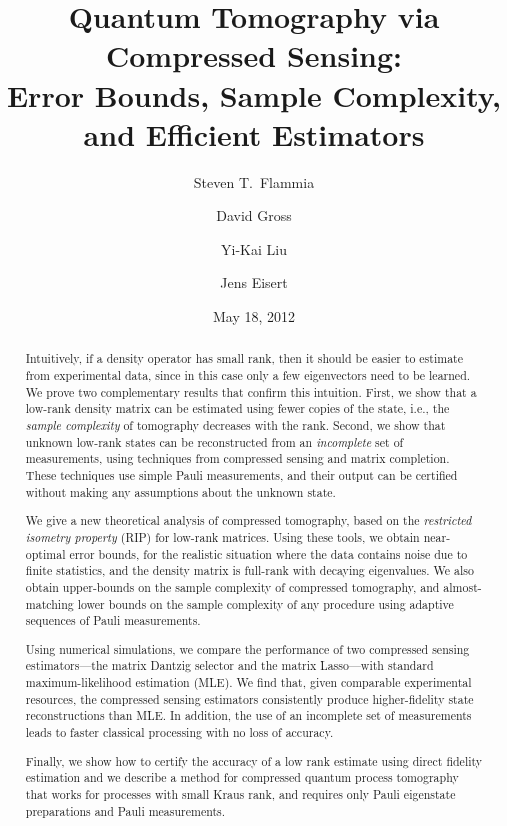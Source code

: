 \documentclass[aps,pra,10pt,superscriptaddress,twocolumn,nofootinbib]{revtex4}
\theoremstyle{remark}
\begin{document}
\title{Quantum Tomography via Compressed Sensing:\\
Error Bounds, Sample Complexity, and Efficient Estimators}

\author{Steven T.\ Flammia}
\author{David Gross}
\author{Yi-Kai Liu}
\author{Jens Eisert}

\date{May 18, 2012}

\begin{abstract}
Intuitively, if a density operator has small rank, then it should be easier to estimate from experimental data, since in this case only a few eigenvectors need to be learned. We prove two complementary results that confirm this intuition. First, we show that a low-rank density matrix can be estimated using fewer copies of the state, i.e., the \textit{sample complexity} of tomography decreases with the rank. Second, we show that unknown low-rank states can be reconstructed from an \textit{incomplete} set of measurements, using techniques from compressed sensing and matrix completion. These techniques use simple Pauli measurements, and their output can be certified without making any assumptions about the unknown state.

We give a new theoretical analysis of compressed tomography, based on the \textit{restricted isometry property} (RIP) for low-rank matrices. Using these tools, we obtain near-optimal error bounds, for the realistic situation where the data contains noise due to finite statistics, and the density matrix is full-rank with decaying eigenvalues. We also obtain upper-bounds on the sample complexity of compressed tomography, and almost-matching lower bounds on the sample complexity of any procedure using adaptive sequences of Pauli measurements.

Using numerical simulations, we compare the performance of two compressed sensing estimators---the matrix Dantzig selector and the matrix Lasso---with standard maximum-likelihood estimation (MLE). We find that, given comparable experimental resources, the compressed sensing estimators consistently produce higher-fidelity state reconstructions than MLE.  In addition, the use of an incomplete set of measurements leads to faster classical processing with no loss of accuracy.

Finally, we show how to certify the accuracy of a low rank estimate using direct fidelity estimation and we describe a method for compressed quantum process tomography that works for processes with small Kraus rank, and requires only Pauli eigenstate preparations and Pauli measurements.  
\end{abstract}
\end{document}
